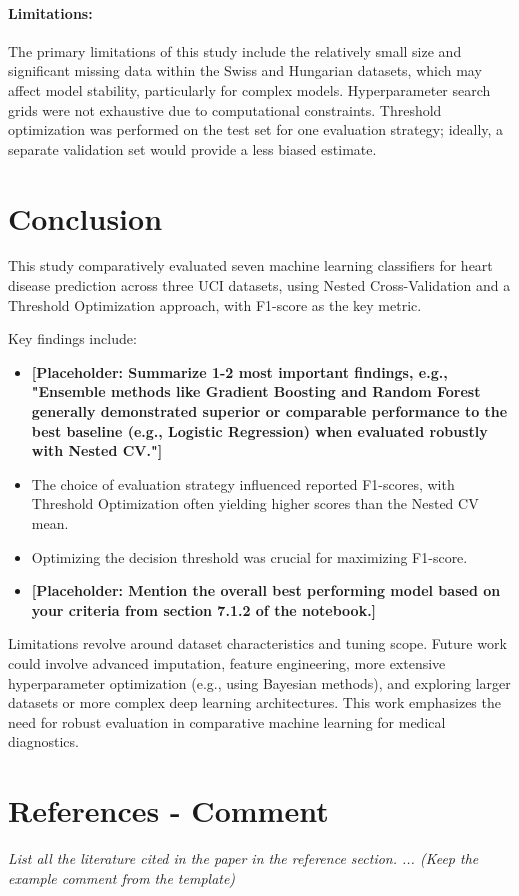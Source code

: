 \documentclass{article}
\begin{document}
\paragraph{Limitations:}
The primary limitations of this study include the relatively small size and significant missing data within the Swiss and Hungarian datasets, which may affect model stability, particularly for complex models. Hyperparameter search grids were not exhaustive due to computational constraints. Threshold optimization was performed on the test set for one evaluation strategy; ideally, a separate validation set would provide a less biased estimate.

\section{Conclusion}
This study comparatively evaluated seven machine learning classifiers for heart disease prediction across three UCI datasets, using Nested Cross-Validation and a Threshold Optimization approach, with F1-score as the key metric.

Key findings include:
\begin{itemize}
    \item \textbf{[Placeholder: Summarize 1-2 most important findings, e.g., "Ensemble methods like Gradient Boosting and Random Forest generally demonstrated superior or comparable performance to the best baseline (e.g., Logistic Regression) when evaluated robustly with Nested CV."]}
    \item The choice of evaluation strategy influenced reported F1-scores, with Threshold Optimization often yielding higher scores than the Nested CV mean.
    \item Optimizing the decision threshold was crucial for maximizing F1-score.
    \item \textbf{[Placeholder: Mention the overall best performing model based on your criteria from section 7.1.2 of the notebook.]}
\end{itemize}

Limitations revolve around dataset characteristics and tuning scope. Future work could involve advanced imputation, feature engineering, more extensive hyperparameter optimization (e.g., using Bayesian methods), and exploring larger datasets or more complex deep learning architectures. This work emphasizes the need for robust evaluation in comparative machine learning for medical diagnostics.

\section*{References - Comment}
\textit{List all the literature cited in the paper in the reference section. ... (Keep the example comment from the template)}
\end{document}
